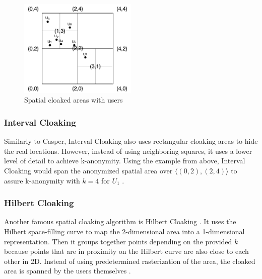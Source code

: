 \begin{figure}[htpb]
  \centering
  \includegraphics[width=0.5\textwidth]{figures/casper.png}
  \caption{Spatial cloaked areas with users} 
  \label{fig:casper}
\end{figure}

\subsubsection{Interval Cloaking}
Similarly to Casper, Interval Cloaking also uses rectangular cloaking areas to hide the real locations. However, instead of using neighboring squares, it uses a lower level of detail to achieve k-anonymity. Using the example from above, Interval Cloaking would span the anonymized spatial area over \(\langle(0,2),(2,4)\rangle\) to assure k-anonymity with \(k=4\) for \(U_1\) \cite{DBLP:conf/ssd/TanLM09}\cite{DBLP:conf/pet/ChengZBP06}.

\subsubsection{Hilbert Cloaking}
Another famous spatial cloaking algorithm is Hilbert Cloaking \cite{DBLP:conf/socialcom/UmKC10}. It uses the Hilbert space-filling curve to map the 2-dimensional area into a 1-dimensional representation. Then it groups together points depending on the provided \(k\) because points that are in proximity on the Hilbert curve are also close to each other in 2D. Instead of using predetermined rasterization of the area, the cloaked area is spanned by the users themselves \cite{DBLP:journals/is/GhinitaZPK10}\cite{DBLP:journals/sigkdd/Gkoulalas-DivanisKV10}\cite{DBLP:conf/ssd/TanLM09}.

